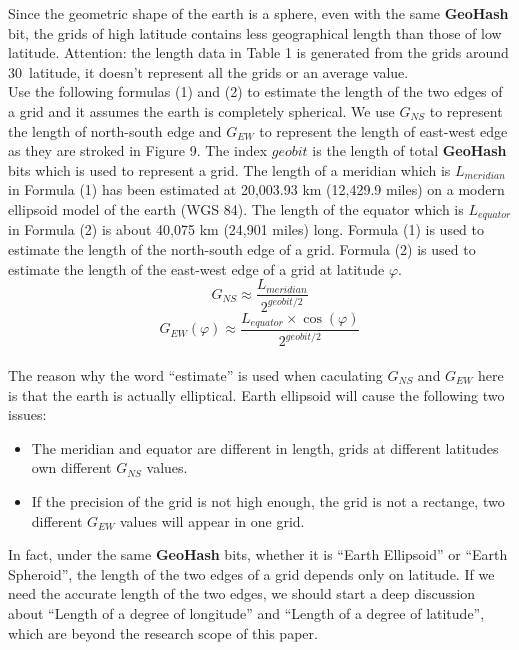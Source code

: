 \documentclass[sigplan,screen]{acmart}
\begin{document}
Since the geometric shape of the earth is a sphere, even with the same \textbf{GeoHash} bit, the grids of high latitude contains less geographical length than those of low latitude.
Attention: the length data in Table 1 is generated from the grids around 30\degree\ latitude, it doesn't represent all the grids or an average value.
\\
Use the following formulas (1) and (2) to estimate the length of the two edges of a grid and it assumes the earth is completely spherical.
We use $G_{NS}$ to represent the length of north-south edge and $G_{EW}$ to represent the length of east-west edge as they are stroked in Figure 9.
The index $geobit$ is the length of total \textbf{GeoHash} bits which is used to represent a grid.
The length of a meridian which is $L_{meridian}$ in Formula (1) has been estimated at 20,003.93 km (12,429.9 miles) on a modern ellipsoid model of the earth (WGS 84)\cite{weintrit2013so}.
The length of the equator which is $L_{equator}$ in Formula (2) is about 40,075 km (24,901 miles) long\cite{equator2011}.
Formula (1) is used to estimate the length of the north-south edge of a grid.
Formula (2) is used to estimate the length of the east-west edge of a grid at latitude $\varphi$.
\begin{equation}
	G_{NS}\approx\frac{L_{meridian}}{2^{geobit/2}}
\end{equation}
\begin{equation}
	G_{EW}(\varphi)\approx\frac{L_{equator}\times\cos(\varphi)}{2^{geobit/2}}
\end{equation}
\\
The reason why the word ``estimate'' is used when caculating $G_{NS}$ and $G_{EW}$ here is that the earth is actually elliptical.
Earth ellipsoid will cause the following two issues:
\begin{itemize}
	\item The meridian and equator are different in length, grids at different latitudes own different $G_{NS}$ values.
	\item If the precision of the grid is not high enough, the grid is not a rectange, two different $G_{EW}$ values will appear in one grid.
\end{itemize}
In fact, under the same \textbf{GeoHash} bits, whether it is ``Earth Ellipsoid'' or ``Earth Spheroid'', the length of the two edges of a grid depends only on latitude.
If we need the accurate length of the two edges, we should start a deep discussion about ``Length of a degree of longitude'' and ``Length of a degree of latitude'', which are beyond the research scope of this paper.
\end{document}
